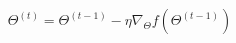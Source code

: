 \documentclass[preview]{standalone}
\begin{document}
\begin{align*}
\Theta^{(t)} = \Theta^{(t-1)} - \eta \nabla_\Theta f(\Theta^{(t-1)})
\end{align*}
\end{document}
